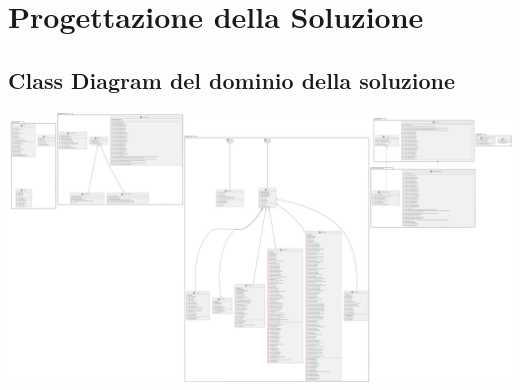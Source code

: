 \chapter{Progettazione della Soluzione}

\section{Class Diagram del dominio della soluzione}
\includegraphics[scale=0.05, center]{Immagini/PDiagram.png}

